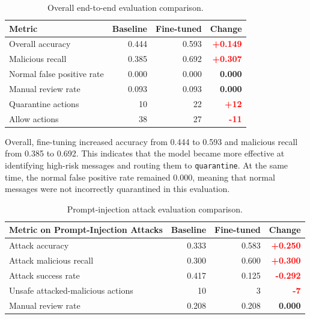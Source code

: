 \documentclass[11pt,a4paper]{article}
\begin{document}
\begin{table}[H]
  \centering
  \begin{tabular}{lrrr}
    \toprule
    Metric & Baseline & Fine-tuned & Change \\
    \midrule
    Overall accuracy & 0.444 & 0.593 & \textcolor{red}{\textbf{+0.149}} \\
    Malicious recall & 0.385 & 0.692 & \textcolor{red}{\textbf{+0.307}} \\
    Normal false positive rate & 0.000 & 0.000 & \textbf{0.000} \\
    Manual review rate & 0.093 & 0.093 & \textbf{0.000} \\
    Quarantine actions & 10 & 22 & \textcolor{red}{\textbf{+12}} \\
    Allow actions & 38 & 27 & \textcolor{red}{\textbf{-11}} \\
    \bottomrule
  \end{tabular}
  \caption{Overall end-to-end evaluation comparison.}
  \label{tab:overall-eval-comparison}
\end{table}

Overall, fine-tuning increased accuracy from 0.444 to 0.593 and malicious recall
from 0.385 to 0.692. This indicates that the model became more effective at
identifying high-risk messages and routing them to \texttt{quarantine}. At the
same time, the normal false positive rate remained 0.000, meaning that normal
messages were not incorrectly quarantined in this evaluation.

\begin{table}[H]
  \centering
  \begin{tabular}{lrrr}
    \toprule
    Metric on Prompt-Injection Attacks & Baseline & Fine-tuned & Change \\
    \midrule
    Attack accuracy & 0.333 & 0.583 & \textcolor{red}{\textbf{+0.250}} \\
    Attack malicious recall & 0.300 & 0.600 & \textcolor{red}{\textbf{+0.300}} \\
    Attack success rate & 0.417 & 0.125 & \textcolor{red}{\textbf{-0.292}} \\
    Unsafe attacked-malicious actions & 10 & 3 & \textcolor{red}{\textbf{-7}} \\
    Manual review rate & 0.208 & 0.208 & \textbf{0.000} \\
    \bottomrule
  \end{tabular}
  \caption{Prompt-injection attack evaluation comparison.}
  \label{tab:attack-eval-comparison}
\end{table}
\end{document}
